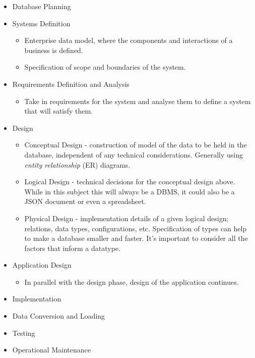\documentclass[12pt]{report}
\begin{document}
\begin{flushleft}
\begin{itemize}
    \item Database Planning
    \item Systems Definition
        \begin{itemize}
            \item Enterprise data model, where the components and interactions
                of a business is defined. 
            \item Specification of scope and boundaries of the system. 
        \end{itemize}
    \item Requirements Definition and Analysis
        \begin{itemize}
            \item Take in requirements for the system and analyse them to define
                a system that will satisfy them.
        \end{itemize}
    \item Design
        \begin{itemize}
            \item Conceptual Design - construction of model of the data to be
                held in the database, independent of any technical
                considerations. Generally using \textit{entity relationship}
                (ER) diagrams.
            \item Logical Design - technical decisions for the conceptual
                design above. While in this subject this will always be a DBMS,
                it could also be a JSON document or even a spreadsheet.
            \item Physical Design - implementation details of a given logical
                design; relations, data types, configurations, etc.
                Specification of types can help to make a database smaller and
                faster. It's important to consider all the factors that inform
                a datatype.
        \end{itemize}
    \item Application Design
        \begin{itemize}
            \item In parallel with the design phase, design of the application
                continues.
        \end{itemize}
    \item Implementation
    \item Data Conversion and Loading
    \item Testing
    \item Operational Maintenance
\end{itemize}


\end{flushleft}
\end{document}
